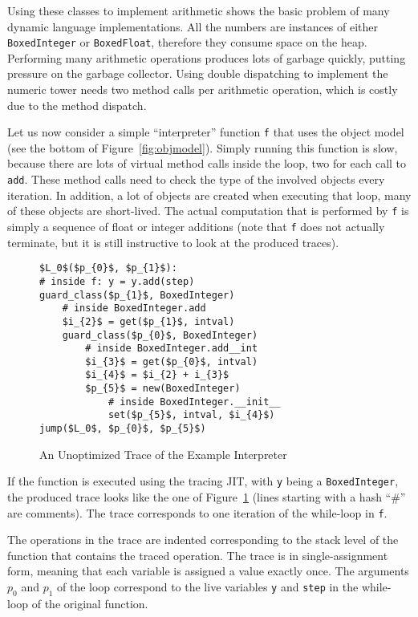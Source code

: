 \documentclass[preprint]{sigplanconf}
\begin{document}
Using these classes to implement arithmetic shows the basic problem of many
dynamic language implementations. All the numbers are instances of either
\lstinline{BoxedInteger} or \lstinline{BoxedFloat}, therefore they consume space on the
heap. Performing many arithmetic operations produces lots of garbage quickly,
putting pressure on the garbage collector. Using double dispatching to
implement the numeric tower needs two method calls per arithmetic operation,
which is costly due to the method dispatch.

Let us now consider a simple ``interpreter'' function \lstinline{f} that uses the
object model (see the bottom of Figure~\ref{fig:objmodel}).
Simply running this function is slow, because there are lots of virtual method
calls inside the loop, two for each
call to \lstinline{add}. These method calls need to check the type of the involved
objects every iteration. In addition, a lot of objects are created
when executing that loop, many of these objects are short-lived.
The actual computation that is performed by \lstinline{f} is simply a sequence of
float or integer additions (note that \lstinline{f} does not actually terminate,
but it is still instructive to look at the produced traces).


\begin{figure}
\begin{lstlisting}[mathescape,numbers = right,basicstyle=\setstretch{1.05}\ttfamily\scriptsize]
$L_0$($p_{0}$, $p_{1}$):
# inside f: y = y.add(step)
guard_class($p_{1}$, BoxedInteger)
    # inside BoxedInteger.add
    $i_{2}$ = get($p_{1}$, intval)
    guard_class($p_{0}$, BoxedInteger)
        # inside BoxedInteger.add__int
        $i_{3}$ = get($p_{0}$, intval)
        $i_{4}$ = $i_{2} + i_{3}$
        $p_{5}$ = new(BoxedInteger)
            # inside BoxedInteger.__init__
            set($p_{5}$, intval, $i_{4}$)
jump($L_0$, $p_{0}$, $p_{5}$)
\end{lstlisting}
\caption{An Unoptimized Trace of the Example Interpreter}
\label{fig:unopt-trace}
\end{figure}

If the function is executed using the tracing JIT, with \lstinline{y} being a
\lstinline{BoxedInteger}, the produced trace looks like the one of
Figure~\ref{fig:unopt-trace} (lines starting with a hash ``\#'' are comments).
The trace corresponds to one iteration of the while-loop in \lstinline{f}.

The operations in the trace are indented
corresponding to the stack level of the function that contains the traced
operation. The trace is in single-assignment form, meaning that each variable is
assigned a value exactly once. The arguments $p_0$ and $p_1$ of the loop correspond
to the live variables \lstinline{y} and \lstinline{step} in the while-loop of
the original function.
\end{document}
